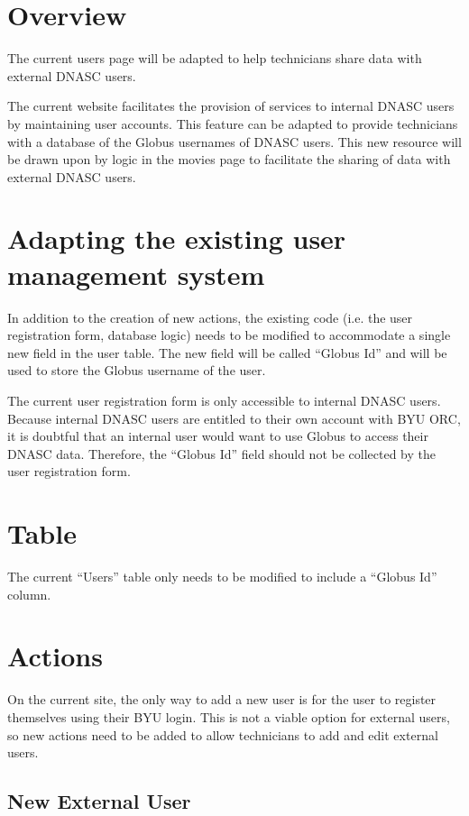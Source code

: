 \section{Overview}

The current users page will be adapted to help technicians share data with 
external DNASC users.

The current website facilitates the provision of services to internal DNASC users 
by maintaining user accounts. This feature can be adapted to provide technicians
with a database of the Globus usernames of DNASC users. This new resource will be
drawn upon by logic in the movies page to facilitate the sharing of data with 
external DNASC users.

\section{Adapting the existing user management system}

In addition to the creation of new actions, the existing code (i.e. the user 
registration form, database logic) needs to be modified to accommodate a 
single new field in the user table. The new field will be called ``Globus Id'' and 
will be used to store the Globus username of the user.

The current user registration form is only accessible to internal DNASC users.
Because internal DNASC users are entitled to their own account with BYU ORC, it is 
doubtful that an internal user would want to use Globus to access their DNASC data. 
Therefore, the ``Globus Id'' field should not be collected by the user registration form.

\section{Table}

The current ``Users'' table only needs to be modified to include a ``Globus Id'' column.

\section{Actions}

On the current site, the only way to add a new user is for the user to register
themselves using their BYU login. This is not a viable option for external users,
so new actions need to be added to allow technicians to add and edit external users.

\subsection{New External User}

